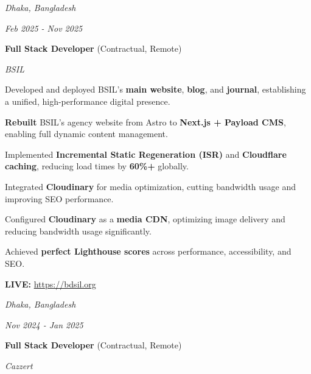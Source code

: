 
    \vspace{0.15 cm}

    \begin{twocolentry}{
    \textit{Dhaka, Bangladesh}
        
    \textit{Feb 2025 - Nov 2025}}
        \textbf{Full Stack Developer} (Contractual, Remote)
        
        \textit{BSIL}
    \end{twocolentry}

    \vspace{0.10 cm}
    \begin{onecolentry}
        \begin{highlights}
            \item Developed and deployed BSIL's \textbf{main website}, \textbf{blog}, and \textbf{journal}, establishing a unified, high-performance digital presence.
            \item \textbf{Rebuilt} BSIL's agency website from Astro to \textbf{Next.js + Payload CMS}, enabling full dynamic content management.
            \item Implemented \textbf{Incremental Static Regeneration (ISR)} and \textbf{Cloudflare caching}, reducing load times by \textbf{60\%+} globally.
            \item Integrated \textbf{Cloudinary} for media optimization, cutting bandwidth usage and improving SEO performance.
            \item Configured \textbf{Cloudinary} as a \textbf{media CDN}, optimizing image delivery and reducing bandwidth usage significantly.
            \item Achieved \textbf{perfect Lighthouse scores} across performance, accessibility, and SEO.
            \item \textbf{LIVE:} \url{https://bdsil.org}
        \end{highlights}
    \end{onecolentry}


    \vspace{0.15 cm}

    \begin{twocolentry}{
    \textit{Dhaka, Bangladesh}
        
    \textit{Nov 2024 - Jan 2025}}
        \textbf{Full Stack Developer} (Contractual, Remote)
        
        \textit{Cazzert}
    \end{twocolentry}

